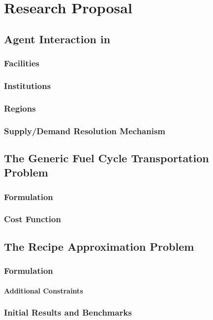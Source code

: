 \chapter{Research Proposal}\label{ch:research}



\section{Agent Interaction in \Cyclus}

\subsection{Facilities}
\subsection{Institutions}
\subsection{Regions}
\subsection{Supply/Demand Resolution Mechanism}

\section{The Generic Fuel Cycle Transportation Problem}

\subsection{Formulation}



\subsection{Cost Function}\label{sec:cost-function}




\section{The Recipe Approximation Problem}

\subsection{Formulation}
\subsubsection{Additional Constraints}
\subsection{Initial Results and Benchmarks}
